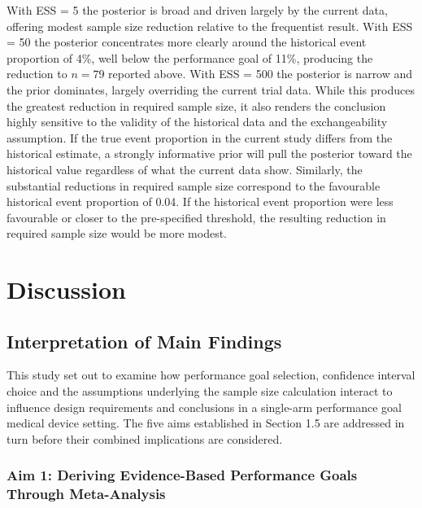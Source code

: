 \documentclass{article}
\begin{document}
With ESS = 5 the posterior is broad and driven largely by the current
data, offering modest sample size reduction relative to the frequentist
result. With ESS = 50 the posterior concentrates more clearly around the
historical event proportion of 4\%, well below the performance goal of
11\%, producing the reduction to \(n = 79\) reported above. With ESS =
500 the posterior is narrow and the prior dominates, largely overriding
the current trial data. While this produces the greatest reduction in
required sample size, it also renders the conclusion highly sensitive to
the validity of the historical data and the exchangeability assumption.
If the true event proportion in the current study differs from the
historical estimate, a strongly informative prior will pull the
posterior toward the historical value regardless of what the current
data show. Similarly, the substantial reductions in required sample size
correspond to the favourable historical event proportion of 0.04. If the
historical event proportion were less favourable or closer to the
pre-specified threshold, the resulting reduction in required sample size
would be more modest.

\newpage

\section{Discussion}\label{discussion}

\subsection{Interpretation of Main
Findings}\label{interpretation-of-main-findings}

This study set out to examine how performance goal selection, confidence
interval choice and the assumptions underlying the sample size
calculation interact to influence design requirements and conclusions in
a single-arm performance goal medical device setting. The five aims
established in Section 1.5 are addressed in turn before their combined
implications are considered.

\subsubsection{Aim 1: Deriving Evidence-Based Performance Goals Through
Meta-Analysis}\label{aim-1-deriving-evidence-based-performance-goals-through-meta-analysis}
\end{document}
